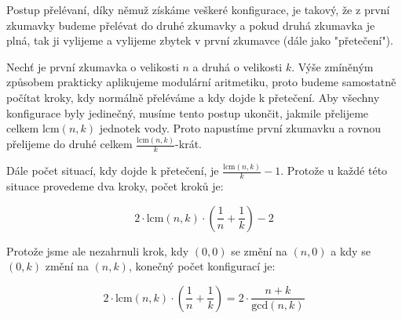 \documentclass{fkssolpub}
\author{Ondřej Sedláček}
\begin{document}
Postup přelévaní, díky němuž získáme veškeré konfigurace, je
takový, že z první zkumavky budeme přelévat do druhé zkumavky
a pokud druhá zkumavka je plná, tak ji vylijeme a vylijeme zbytek
v první zkumavce (dále jako "přetečení").

Nechť je první zkumavka o velikosti $n$ a druhá o velikosti $k$.
Výše zmíněným způsobem prakticky aplikujeme modulární aritmetiku,
proto budeme samostatně počítat kroky, kdy normálně přeléváme a kdy
dojde k přetečení. Aby všechny konfigurace byly jedinečný, musíme
tento postup ukončit, jakmile přelijeme celkem $\text{lcm}(n,k)$
jednotek vody. Proto napustíme první zkumavku a
rovnou přelijeme do druhé celkem $\frac{\text{lcm}(n,k)}{k}$-krát.

Dále počet situací, kdy dojde k přetečení, je
$\frac{\text{lcm}(n,k)}{k} - 1$. Protože u každé této situace
provedeme dva kroky, počet kroků je:

\[
	2 \cdot \text{lcm}(n,k) \cdot \left(\frac{1}{n} + \frac{1}{k}\right) - 2
\]

Protože jsme ale nezahrnuli krok, kdy $(0, 0)$ se změní na $(n, 0)$ a
kdy se $(0, k)$ změní na $(n, k)$, konečný počet konfigurací je:

\[
	2 \cdot \text{lcm}(n,k) \cdot \left(\frac{1}{n} + \frac{1}{k}\right)
	= 2 \cdot \frac{n + k}{\text{gcd}(n,k)}
\]
\end{document}
